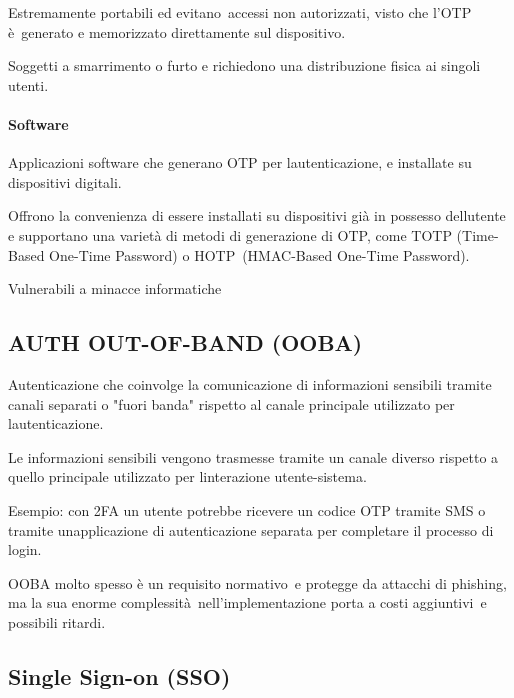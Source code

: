 \documentclass[
]{article}
\begin{document}
{}

{Estremamente portabili ed }{evitano}{~accessi non autorizzati, visto
che }{l'OTP è}{~generato e memorizzato direttamente sul dispositivo.}

{}

{Soggetti a smarrimento o furto e richiedono una distribuzione fisica ai
singoli utenti.}

\paragraph{\texorpdfstring{{Software}}{Software}}\label{h.qxgeepwhhyb}

{Applicazioni software che generano OTP per
l\textquotesingle autenticazione, e installate su dispositivi digitali.
}

{}

{Offrono la convenienza di essere installati su dispositivi già in
possesso dell\textquotesingle utente e supportano una varietà di metodi
di generazione di OTP, come TOTP (Time-Based One-Time Password) }{o
HOTP}{~(HMAC-Based One-Time Password).}

{}

{Vulnerabili a minacce informatiche}

\subsection{\texorpdfstring{{AUTH OUT-OF-BAND
(OOBA)}}{AUTH OUT-OF-BAND (OOBA)}}\label{h.jk8swd1fx77b}

{Autenticazione che coinvolge la comunicazione di informazioni sensibili
tramite canali separati o "fuori banda" rispetto al canale principale
utilizzato per l\textquotesingle autenticazione. }

{}

{Le informazioni sensibili vengono trasmesse tramite un canale diverso
rispetto a quello principale utilizzato per
l\textquotesingle interazione utente-sistema.}

{Esempio}{: con 2FA un utente potrebbe ricevere un codice OTP tramite
SMS o tramite un\textquotesingle applicazione di autenticazione separata
per completare il processo di login.}

{}

{OOBA molto spesso è un }{requisito normativo}{~e }{protegge da attacchi
di phishing}{, }{ma }{la sua }{enorme complessità}{~nell'implementazione
porta a }{costi aggiuntivi}{~e possibili }{ritardi}{.}

\subsection{\texorpdfstring{{Single Sign-on
(SSO)}}{Single Sign-on (SSO)}}\label{h.4rlqbow8u5pc}
\end{document}
